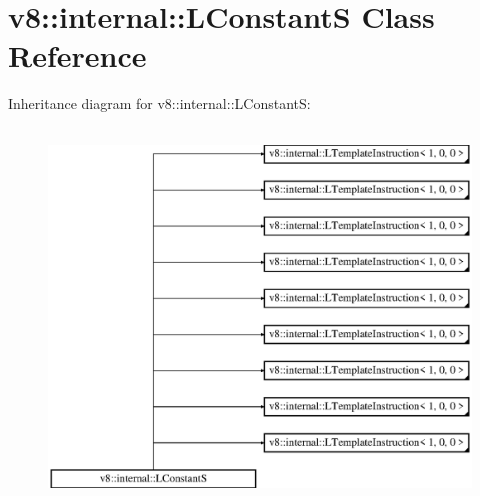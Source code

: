 \hypertarget{classv8_1_1internal_1_1_l_constant_s}{}\section{v8\+:\+:internal\+:\+:L\+ConstantS Class Reference}
\label{classv8_1_1internal_1_1_l_constant_s}
Inheritance diagram for v8\+:\+:internal\+:\+:L\+ConstantS\+:\begin{figure}[H]
\begin{center}
\leavevmode
\includegraphics[height=10.000000cm]{classv8_1_1internal_1_1_l_constant_s}
\end{center}
\end{figure}
